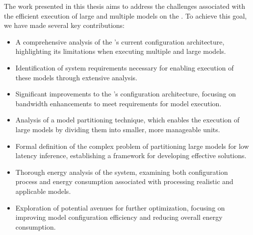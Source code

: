 The work presented in this thesis aims to address the challenges associated with the efficient execution of large and multiple models on the \graicore{}.
To achieve this goal, we have made several key contributions:
\begin{itemize}
    \item 
    A comprehensive analysis of the \graicore{}'s current configuration architecture, highlighting its limitations when executing multiple and large models.
    \item
    Identification of system requirements necessary for enabling execution of these models through extensive analysis.
    \item
    Significant improvements to the \graicore{}'s configuration architecture, focusing on bandwidth enhancements to meet requirements for model execution.
    \item
    Analysis of a model partitioning technique, which enables the execution of large models by dividing them into smaller, more manageable units.
    \item
    Formal definition of the complex problem of partitioning large models for low latency inference, establishing a framework for developing effective solutions.
    \item
    Thorough energy analysis of the system, examining both configuration process and energy consumption associated with processing realistic and applicable models.
    \item
    Exploration of potential avenues for further optimization, focusing on improving model configuration efficiency and reducing overall energy consumption.
\end{itemize}